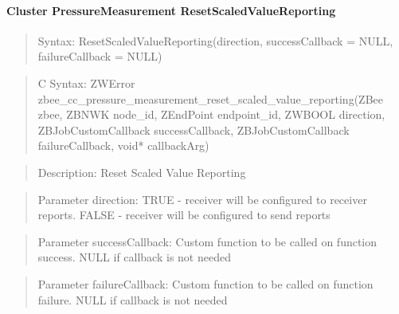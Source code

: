 \paragraph{Cluster PressureMeasurement ResetScaledValueReporting}
\begin{quote}Syntax: ResetScaledValueReporting(direction, successCallback = NULL, failureCallback = NULL)\end{quote}
\begin{quote}C Syntax: ZWError zbee\_cc\_pressure\_measurement\_reset\_scaled\_value\_reporting(ZBee zbee, ZBNWK node\_id, ZEndPoint endpoint\_id, ZWBOOL direction, ZBJobCustomCallback successCallback, ZBJobCustomCallback failureCallback, void* callbackArg)\end{quote}
\begin{quote}Description: Reset Scaled Value Reporting\end{quote}
\begin{quote}Parameter direction: TRUE  - receiver will be configured to receiver reports. FALSE - receiver will be configured to send reports\end{quote}
\begin{quote}Parameter successCallback: Custom function to be called on function success. NULL if callback is not needed\end{quote}
\begin{quote}Parameter failureCallback: Custom function to be called on function failure. NULL if callback is not needed\end{quote}


